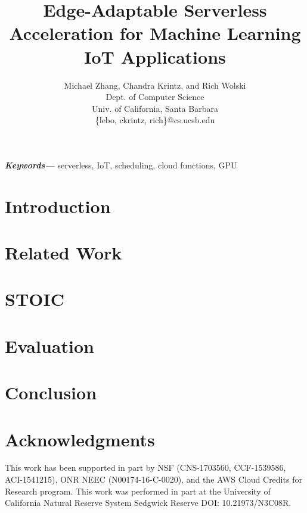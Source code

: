 \documentclass[12pt, onecolumn]{article}
\title{Edge-Adaptable Serverless Acceleration for Machine Learning IoT Applications}
\author{Michael Zhang, Chandra Krintz, and  Rich Wolski \\
        \small Dept. of Computer Science \\
        \small Univ. of California, Santa Barbara \\
        \small \{lebo, ckrintz, rich\}@cs.ucsb.edu \\
}
\date{} %
\providecommand{\keywords}[1]
{
  \small	
  \textbf{\textit{Keywords---}} #1
}
\begin{document}
\maketitle

\begin{abstract}
\label{sec:abstract}

\end{abstract}

\keywords{serverless, IoT, scheduling, cloud functions, GPU}



\section{Introduction}
\label{sec:intro}


\section{Related Work}
\label{sec:related}


\section{STOIC}
\label{sec:stoic}


\section{Evaluation}
\label{sec:results}


\section{Conclusion}
\label{sec:conc}


\section*{Acknowledgments}
This work has been supported in part by NSF (CNS-1703560, CCF-1539586,
ACI-1541215), ONR NEEC (N00174-16-C-0020),
and the AWS Cloud Credits for Research program.
This work was performed in part at the University of California Natural Reserve System Sedgwick Reserve DOI: 10.21973/N3C08R.






\end{document}
